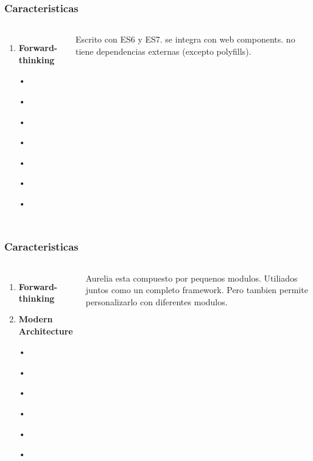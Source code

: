 \documentclass{beamer}
\begin{document}
\begin{frame}
\frametitle{Caracteristicas}
\begin{columns}[c] %

\begin{enumerate}
\item \textbf{Forward-thinking}
\item[•]	
\item[•]	
\item[•]	
\item[•]	
\item[•]	
\item[•]	
\item[•]	
\end{enumerate}

Escrito con ES6 y ES7. se integra con web components. no tiene dependencias externas (excepto polyfills).
\end{columns}
\end{frame}


\begin{frame}
\frametitle{Caracteristicas}
\begin{columns}[c] %

\begin{enumerate}
\item \textbf{Forward-thinking}
\item \textbf{Modern Architecture}
\item[•]	
\item[•]	
\item[•]	
\item[•]	
\item[•]	
\item[•]	
\end{enumerate}

Aurelia esta compuesto por pequenos modulos. Utiliados juntos como un completo framework. Pero tambien permite personalizarlo con diferentes modulos.
\end{columns}
\end{frame}
\end{document}

